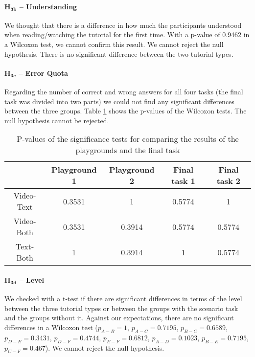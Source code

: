 \paragraph{$\mathbf{H_{3b}}$ -- Understanding}
We thought that there is a difference in how much the participants understood when reading/watching the tutorial for the first time. With a p-value of 0.9462 in a Wilcoxon test, we cannot confirm this result. We cannot reject the null hypothesis. There is no significant difference between the two tutorial types. 


\paragraph{$\mathbf{H_{3c}}$ -- Error Quota}
Regarding the number of correct and wrong answers for all four tasks (the final task was divided into two parts) we could not find any significant differences between the three groups. Table \ref{tab:test} shows the p-values of the Wilcoxon tests. The null hypothesis cannot be rejected.

\begin{table}[!htp]
	\centering 
	
	\caption{P-values of the significance tests for comparing the results of the playgrounds and the final task}
	\label{tab:test}
	
	\normalsize

\begin{tabular}{ccccc}
	 
	& Playground 1 & Playground 2 & Final task 1 & Final task 2 \\ 
	\hline 
	Video-Text &  0.3531 & 1 & 0.5774 & 1 \\ 
	 
	Video-Both & 0.3531 & 0.3914 & 0.5774 & 0.5774 \\ 
	 
	Text-Both & 1 & 0.3914 & 1 & 0.5774 \\ 
	 
\end{tabular} 

\end{table}



\paragraph{$\mathbf{H_{3d}}$ -- Level}

We checked with a t-test if there are significant differences in terms of the level between the three tutorial types or between the groups with the scenario task and the groups without it. Against our expectations, there are no significant differences in a Wilcoxon test ($p_{A-B}=1$, $p_{A-C}=0.7195$, $p_{B-C}=0.6589$, $p_{D-E}=0.3431$, $p_{D-F}=0.4744$, $p_{E-F}=0.6812$, $p_{A-D}= 0.1023$, $p_{B-E}=0.7195$, $p_{C-F}=0.467$). We cannot reject the null hypothesis. 




